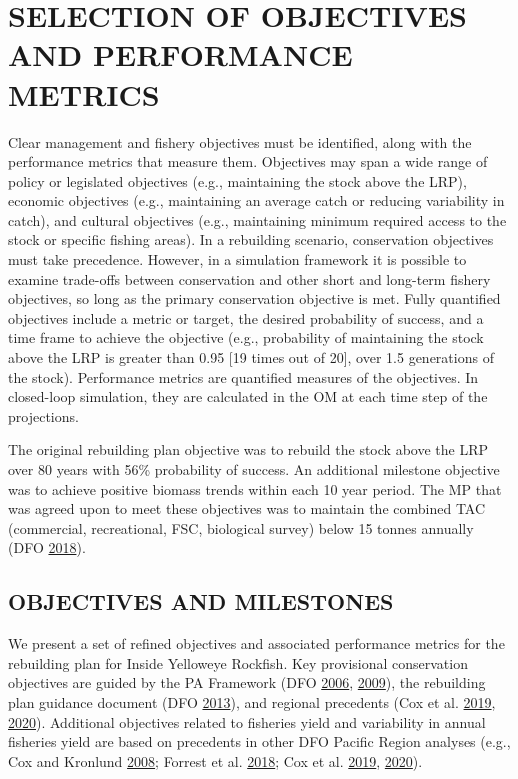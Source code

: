 \documentclass[11pt]{book}
\begin{document}
\hypertarget{sec:objectives-metrics}{%
\section{SELECTION OF OBJECTIVES AND PERFORMANCE METRICS}\label{sec:objectives-metrics}}

Clear management and fishery objectives must be identified, along with the performance metrics that measure them. Objectives may span a wide range of policy or legislated objectives (e.g., maintaining the stock above the LRP), economic objectives (e.g., maintaining an average catch or reducing variability in catch), and cultural objectives (e.g., maintaining minimum required access to the stock or specific fishing areas). In a rebuilding scenario, conservation objectives must take precedence. However, in a simulation framework it is possible to examine trade-offs between conservation and other short and long-term fishery objectives, so long as the primary conservation objective is met. Fully quantified objectives include a metric or target, the desired probability of success, and a time frame to achieve the objective (e.g., probability of maintaining the stock above the LRP is greater than 0.95 {[}19 times out of 20{]}, over 1.5 generations of the stock). Performance metrics are quantified measures of the objectives. In closed-loop simulation, they are calculated in the OM at each time step of the projections.

The original rebuilding plan objective was to rebuild the stock above the LRP over 80 years with 56\% probability of success. An additional milestone objective was to achieve positive biomass trends within each 10 year period. The MP that was agreed upon to meet these objectives was to maintain the combined TAC (commercial, recreational, FSC, biological survey) below 15 tonnes annually (DFO \protect\hyperlink{ref-ifmp2018}{2018}).

\hypertarget{sec:objectives-metrics-obj}{%
\subsection{OBJECTIVES AND MILESTONES}\label{sec:objectives-metrics-obj}}

We present a set of refined objectives and associated performance metrics for the rebuilding plan for Inside Yelloweye Rockfish. Key provisional conservation objectives are guided by the PA Framework (DFO \protect\hyperlink{ref-dfo2006}{2006}, \protect\hyperlink{ref-dfo2009}{2009}), the rebuilding plan guidance document (DFO \protect\hyperlink{ref-dfo2013}{2013}), and regional precedents (Cox et al. \protect\hyperlink{ref-cox2019}{2019}, \protect\hyperlink{ref-cox2020}{2020}). Additional objectives related to fisheries yield and variability in annual fisheries yield are based on precedents in other DFO Pacific Region analyses (e.g., Cox and Kronlund \protect\hyperlink{ref-cox2008a}{2008}; Forrest et al. \protect\hyperlink{ref-forrest2018}{2018}; Cox et al. \protect\hyperlink{ref-cox2019}{2019}, \protect\hyperlink{ref-cox2020}{2020}).
\end{document}
